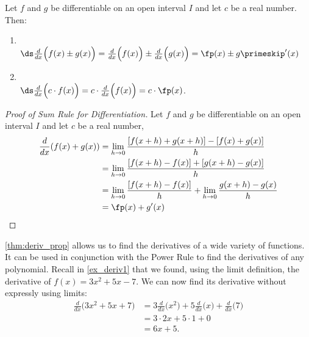\begin{theorem}\label{thm:deriv_prop}
Let $f$ and $g$ be differentiable on an open interval $I$ and let $c$ be a real number. Then:
\begin{enumerate}
	\item	{}\\
	\qquad$\ds \frac{d}{dx}\Big(f(x) \pm g(x)\Big) = \frac{d}{dx}\Big(f(x)\Big) \pm \frac{d}{dx}\Big(g(x)\Big)=\fp(x)\pm g\primeskip'(x)$
	\item	{}\\
	\qquad$\ds \frac{d}{dx}\Big(c\cdot f(x)\Big) = c\cdot\frac{d}{dx}\Big(f(x)\Big) = c\cdot\fp(x)$.
\end{enumerate}
\end{theorem}

\begin{proof}[Proof of Sum Rule for Differentiation]
Let $f$ and $g$ be differentiable on an open interval $I$ and let $c$ be a real number,
\begin{align*}
\frac{d}{dx}( f(x) + g(x))
&= \lim_{h\to 0} \frac{[f(x+h)+g(x+h)] - [f(x)+g(x)]}{h} \\
&= \lim_{h\to 0} \frac{[f(x+h)-f(x)] + [g(x+h) - g(x)]}{h} \\
&= \lim_{h\to 0} \frac{[f(x+h)-f(x)]}{h} + \lim_{h\to 0}\frac {g(x+h) - g(x)}{h}\\
&= \fp(x) + g'(x)\qedhere
\end{align*}
\end{proof}


\autoref{thm:deriv_prop} allows us to find the derivatives of a wide variety of functions. It can be used in conjunction with the Power Rule to find the derivatives of any polynomial. Recall in \autoref{ex_deriv1} that we found, using the limit definition, the derivative of $f(x) = 3x^2+5x-7$. We can now find its derivative without expressly using limits:
\begin{align*}
	\frac{d}{dx}\Big(3x^2+5x+7\Big)
	&= 3\frac{d}{dx}\Big(x^2\Big) + 5\frac{d}{dx}\Big(x\Big) + \frac{d}{dx}\Big(7\Big) \\
	&= 3\cdot 2x+5\cdot 1+ 0\\
	&= 6x+5.
\end{align*}

